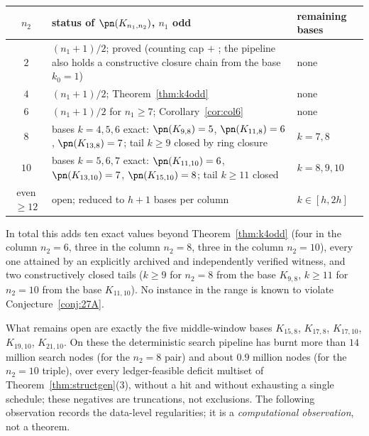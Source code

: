\begin{center}\small
\begin{tabular}{c p{6.4cm} p{3.2cm}}
\hline
$n_2$ & status of $\pn(K_{n_1,n_2})$, $n_1$ odd & remaining bases \\
\hline
$2$ & $(n_1+1)/2$; proved (counting cap $+$ \cite{Pyb96}; the pipeline also holds a
constructive closure chain from the base $k_0=1$) & none \\
$4$ & $(n_1+1)/2$; Theorem~\ref{thm:k4odd} & none \\
$6$ & $(n_1+1)/2$ for $n_1\ge7$; Corollary~\ref{cor:col6} & none \\
$8$ & bases $k=4,5,6$ exact: $\pn(K_{9,8})=5$, $\pn(K_{11,8})=6$, $\pn(K_{13,8})=7$; tail
$k\ge9$ closed by ring closure & $k=7,8$ \\
$10$ & bases $k=5,6,7$ exact: $\pn(K_{11,10})=6$, $\pn(K_{13,10})=7$, $\pn(K_{15,10})=8$; tail
$k\ge11$ closed & $k=8,9,10$ \\
even $\ge12$ & open; reduced to $h+1$ bases per column & $k\in[h,2h]$ \\
\hline
\end{tabular}
\end{center}

In total this adds ten exact values beyond Theorem~\ref{thm:k4odd} (four in the column
$n_2=6$, three in the column $n_2=8$, three in the column $n_2=10$), every one attained by an
explicitly archived and independently verified witness, and two constructively closed tails
($k\ge9$ for $n_2=8$ from the base $K_{9,8}$, $k\ge11$ for $n_2=10$ from the base $K_{11,10}$).
No instance in the range is known to violate Conjecture~\ref{conj:27A}.

What remains open are exactly the five middle-window bases $K_{15,8}$, $K_{17,8}$,
$K_{17,10}$, $K_{19,10}$, $K_{21,10}$. On these the deterministic search pipeline has burnt
more than $14$ million search nodes (for the $n_2=8$ pair) and about $0.9$ million nodes (for
the $n_2=10$ triple), over every ledger-feasible deficit multiset of
Theorem~\ref{thm:structgen}(3), without a hit and without exhausting a single schedule; these
negatives are truncations, not exclusions. The following observation records the data-level
regularities; it is a \emph{computational observation}, not a theorem.

